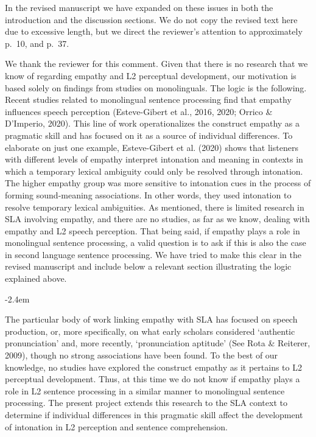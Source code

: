 \documentclass[]{article}
\renewenvironment{quote}{\begin{fquote}\advance\leftmargini -2.4em\begin{oldquote}}{\end{oldquote}\end{fquote}}
\newenvironment{fquote}
  {\def\FrameCommand{
	\fboxsep=0.6em %
	\fcolorbox{black}{white}}%
    \MakeFramed {\advance\hsize-2\width \FrameRestore}
    \begin{minipage}{\linewidth}
  }
  {\end{minipage}\endMakeFramed}
\newcommand{\TaskEstimationBox}[2]{%
\ifoptiondraft{\parbox{1.0\linewidth}{\hfill \hfill {\colorbox{#2}{\color{White} \textbf{#1}}}}}%
{}%
}
\def\Done {\TaskEstimationBox{Done}{Blue}}
\def\Easy {\TaskEstimationBox{Feasible}{ForestGreen}}
\begin{document}
In the revised manuscript we have expanded on these issues in both the introduction and the discussion sections.
We do not copy the revised text here due to excessive length, but we direct the reviewer's attention to approximately p.~10, and p.~37.

\Done
\Easy


We thank the reviewer for this comment.
Given that there is no research that we know of regarding empathy and L2 perceptual development, our motivation is based solely on findings from studies on monolinguals.
The logic is the following.
Recent studies related to monolingual sentence processing find that empathy influences speech perception (Esteve-Gibert et al., 2016, 2020; Orrico \& D'Imperio, 2020).
This line of work operationalizes the construct empathy as a pragmatic skill and has focused on it as a source of individual differences.
To elaborate on just one example, Esteve-Gibert et al. (2020) shows that listeners with different levels of empathy interpret intonation and meaning in contexts in which a temporary lexical ambiguity could only be resolved through intonation.
The higher empathy group was more sensitive to intonation cues in the process of forming sound-meaning associations.
In other words, they used intonation to resolve temporary lexical ambiguities.
As mentioned, there is limited research in SLA involving empathy, and there are no studies, as far as we know, dealing with empathy and L2 speech perception.
That being said, if empathy plays a role in monolingual sentence processing, a valid question is to ask if this is also the case in second language sentence processing.
We have tried to make this clear in the revised manuscript and include below a relevant section illustrating the logic explained above.

\begin{quote}
The particular body of work linking empathy with SLA has focused on speech production, or, more specifically, on what early scholars considered `authentic pronunciation' and, more recently, `pronunciation aptitude' (See Rota \& Reiterer, 2009), though no strong associations have been found.
To the best of our knowledge, no studies have explored the construct empathy as it pertains to L2 perceptual development.
Thus, at this time we do not know if empathy plays a role in L2 sentence processing in a similar manner to monolingual sentence processing.
The present project extends this research to the SLA context to determine if individual differences in this pragmatic skill affect the development of intonation in L2 perception and sentence comprehension.
\end{quote}
\end{document}
